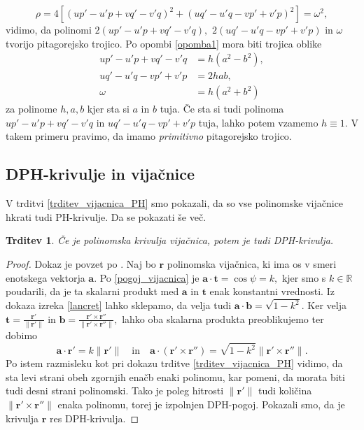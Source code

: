 \documentclass[12pt,a4paper,twoside]{article}
\theoremstyle{definition} %
\theoremstyle{plain} %
\newtheorem{trditev}[definicija]{Trditev}
\theoremstyle{primerstyle}
\numberwithin{equation}{section}  %
\newcommand{\R}{\mathbb R}
\newcommand{\binormala}{\frac{\mathbf{r}'\times\mathbf{r}''}{\lVert \mathbf{r}'\times\mathbf{r}'' \rVert}}
\newcommand{\tV}{\mathbf{t}}
\newcommand{\aV}{\mathbf{a}}
\newcommand{\bV}{\mathbf{b}}
\newcommand{\rV}{\mathbf{r}}
\newcommand{\ndr}{\lVert \mathbf{r}'\rVert} %
\newcommand{\ndrtddr}{\lVert \mathbf{r}'\times \mathbf{r}'' \rVert} %
\begin{document}
\begin{equation}
	\label{rho_omega2}
	\rho=4[(up'-u'p+vq'-v'q)^2+(uq'-u'q-vp'+v'p)^2]=\omega^2,
\end{equation}
vidimo, da polinomi $2(up'-u'p+vq'-v'q),$ $2(uq'-u'q-vp'+v'p)$ in $\omega$ tvorijo pitagorejsko trojico. Po opombi \ref{opomba1} mora biti trojica oblike
\begin{align}
	up'-u'p+vq'-v'q&=h(a^2-b^2), \nonumber \\
	uq'-u'q-vp'+v'p&=2hab, \label{kubota} \\
	\omega&=h(a^2+b^2) \nonumber
\end{align}
za polinome $h,a,b$ kjer sta si $a$ in $b$ tuja. Če sta si tudi polinoma $up'-u'p+vq'-v'q$ in $uq'-u'q-vp'+v'p$ tuja, lahko potem vzamemo $h\equiv 1.$ V takem primeru pravimo, da imamo \emph{primitivno} pitagorejsko trojico.

\subsection{DPH-krivulje in vijačnice}
\label{sec_DPH_in_vijacnice}

V trditvi \ref{trditev_vijacnica_PH} smo pokazali, da so vse polinomske vijačnice hkrati tudi PH-krivulje. Da se pokazati še več.
\begin{trditev}
	\label{trditev_vijacnica_DPH}
	Če je polinomska krivulja vijačnica, potem je tudi DPH-krivulja.
\end{trditev}
\begin{proof}
	Dokaz je povzet po \cite[str.\ 117]{beltranmonterde}. Naj bo $\rV$ polinomska vijačnica, ki ima os v smeri enotskega vektorja $\aV.$ Po \eqref{pogoj_vijacnica} je $\aV\cdot\tV=\cos \psi=k,$ kjer smo s $k \in \R$ poudarili, da je ta skalarni produkt med $\aV$ in $\tV$ enak konstantni vrednosti. Iz dokaza izreka \ref{lancret} lahko sklepamo, da velja tudi $\aV\cdot\bV=\sqrt{1-k^2}.$ Ker velja $\tV=\frac{\rV'}{\lVert \rV' \rVert}$ in $\bV=\binormala,$ lahko oba skalarna produkta preoblikujemo ter dobimo
	\begin{equation}
		\aV\cdot\rV'=k\ndr \quad \text{in} \quad \aV\cdot (\rV'\times\rV'')=\sqrt{1-k^2}\ndrtddr .
	\end{equation}
	Po istem razmisleku kot pri dokazu trditve \ref{trditev_vijacnica_PH} vidimo, da sta levi strani obeh zgornjih enačb enaki polinomu, kar pomeni, da morata biti tudi desni strani polinomski. Tako je poleg hitrosti $\ndr$ tudi količina $\ndrtddr$ enaka polinomu, torej je izpolnjen DPH-pogoj. Pokazali smo, da je krivulja $\rV$ res DPH-krivulja.
\end{proof}
\end{document}
